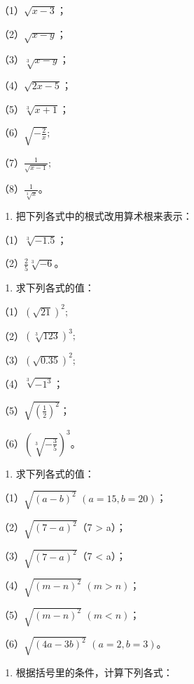 （1）\(\sqrt{x - 3}\)；

（2）\(\sqrt{x - y}\)；

（3）\(\sqrt[3]{x - y}\)；

（4）\(\sqrt{2x - 5}\)；

（5）\(\sqrt[3]{x + 1}\)；

（6）\(\sqrt{-\frac{2}{x}};\)

（7）\(\frac{1}{\sqrt{x - 1}};\)

（8）\(\frac{1}{\sqrt[3]{x}}\)。

\begin{enumerate}[start=4]
\item
  把下列各式中的根式改用算术根来表示：
\end{enumerate}

（1）\(\sqrt[3]{-1.5}\)；

（2）\(\frac{2}{5}\sqrt[3]{-6}\)。

\begin{enumerate}[start=5]
\item
  求下列各式的值：
\end{enumerate}

（1）\((\sqrt{21})^2;\)

（2）\((\sqrt[3]{123})^3;\)

（3）\((\sqrt{0.35})^2;\)

（4）\(\sqrt[3]{-1^3}\)；

（5）\(\sqrt{\left(\frac{1}{2}\right)^2}\)；

（6）\(\left(\sqrt[3]{-\frac{3}{5}}\right)^3\)。

\begin{enumerate}[start=6]
\item
  求下列各式的值：
\end{enumerate}

（1）\(\sqrt{(a - b)^2}\) \((a = 15, b = 20)\)；

（2）\(\sqrt{(7 - a)^2}\)（7 \textgreater{} a）；

（3）\(\sqrt{(7 - a)^2}\)（7 \textless{} a）；

（4）\(\sqrt{(m - n)^2}\) \((m > n)\)；

（5）\(\sqrt{(m - n)^2}\) \((m < n)\)；

（6）\(\sqrt{(4a - 3b)^2}\) \((a = 2, b = 3)\)。

\begin{enumerate}[start=7]
\item
  根据括号里的条件，计算下列各式：
\end{enumerate}

